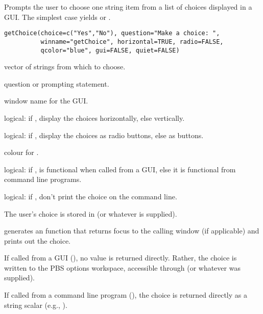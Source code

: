 \documentclass[letterpaper]{book}
\begin{document}
\begin{Description}\relax
Prompts the user to choose one string item from a list of 
choices displayed in a GUI. The simplest case  
yields  or .
\end{Description}
\begin{Usage}
\begin{verbatim}
getChoice(choice=c("Yes","No"), question="Make a choice: ",
          winname="getChoice", horizontal=TRUE, radio=FALSE,
          qcolor="blue", gui=FALSE, quiet=FALSE)
\end{verbatim}
\end{Usage}
\begin{Arguments}
\begin{ldescription}
\item[\code{choice }] vector of strings from which to choose.
\item[\code{question }] question or prompting statement.
\item[\code{winname }] window name for the  GUI.
\item[\code{horizontal }] logical: if , display the choices horizontally, else vertically.
\item[\code{radio }] logical: if , display the choices as radio buttons, else as buttons.
\item[\code{qcolor }] colour for .
\item[\code{gui }] logical: if ,  is functional when called from a GUI,
else it is functional from command line programs.
\item[\code{quiet }] logical: if , don't print the choice on the command line.
\end{ldescription}
\end{Arguments}
\begin{Details}\relax
The user's choice is stored in  
(or whatever  is supplied).

 generates an  function that returns focus
to the calling window (if applicable) and prints out the choice.
\end{Details}
\begin{Value}
If called from a GUI (), no value is returned directly. Rather, 
the choice is written to the PBS options workspace, accessible through 
 (or whatever  was supplied).

If called from a command line program (), the choice is returned 
directly as a string scalar (e.g.,  ).
\end{Value}
\end{document}

